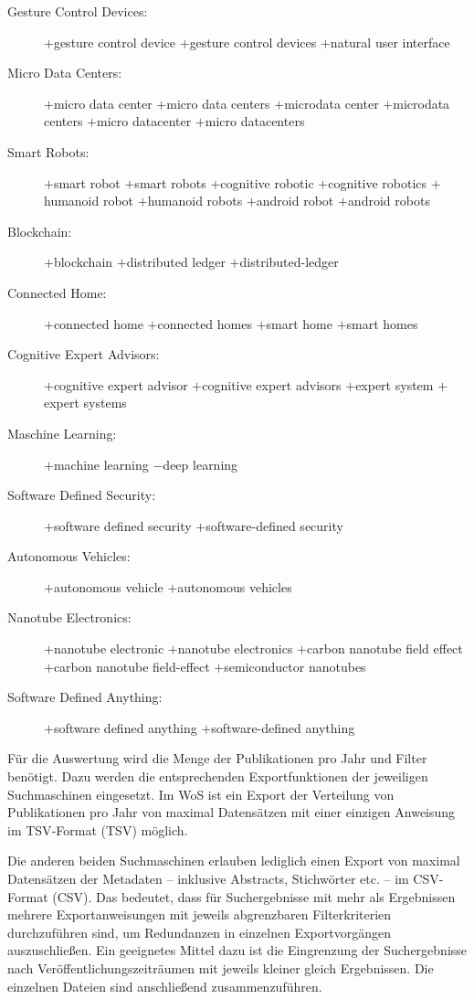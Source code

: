 \begin{description}
	\item[Gesture Control Devices:] $+$gesture control device $+$gesture control devices $+$natural user interface
	\item[Micro Data Centers:] $+$micro data center $+$micro data centers $+$microdata center $+$microdata centers $+$micro datacenter $+$micro datacenters
	\item[Smart Robots:] $+$smart robot $+$smart robots $+$cognitive robotic $+$cognitive robotics $+$humanoid robot  $+$humanoid robots $+$android robot $+$android robots
	\item[Blockchain:] $+$blockchain $+$distributed ledger $+$distributed-ledger
	\item[Connected Home:] $+$connected home $+$connected homes $+$smart home $+$smart homes
	\item[Cognitive Expert Advisors:] $+$cognitive expert advisor $+$cognitive expert advisors $+$expert system $+$expert systems
	\item[Maschine Learning:] $+$machine learning $-$deep learning
	\item[Software Defined Security:] $+$software defined security $+$software-defined security
	\item[Autonomous Vehicles:] $+$autonomous vehicle $+$autonomous vehicles
	\item[Nanotube Electronics:] $+$nanotube electronic $+$nanotube electronics $+$carbon nanotube field effect $+$carbon nanotube field-effect $+$semiconductor nanotubes
	\item[Software Defined Anything:] $+$software defined anything $+$software-defined anything
\end{description}

Für die Auswertung wird die Menge der Publikationen pro Jahr und Filter benötigt. Dazu werden die entsprechenden Exportfunktionen der jeweiligen Suchmaschinen eingesetzt. Im \ac{WoS} ist ein Export der Verteilung von Publikationen pro Jahr von maximal  Datensätzen mit einer einzigen Anweisung im \acs{TSV}-Format (\acl{TSV}) möglich.

Die anderen beiden Suchmaschinen erlauben lediglich einen Export von maximal  Datensätzen der Metadaten -- inklusive Abstracts, Stichwörter etc. -- im \acs{CSV}-Format (\acl{CSV}). Das bedeutet, dass für Suchergebnisse mit mehr als  Ergebnissen mehrere Exportanweisungen mit jeweils abgrenzbaren Filterkriterien durchzuführen sind, um Redundanzen in einzelnen Exportvorgängen auszuschließen. Ein geeignetes Mittel dazu ist die Eingrenzung der Suchergebnisse nach Ver\-öffentlichungs\-zeiträumen mit jeweils kleiner gleich  Ergebnissen. Die einzelnen Dateien sind anschließend zusammenzuführen.

